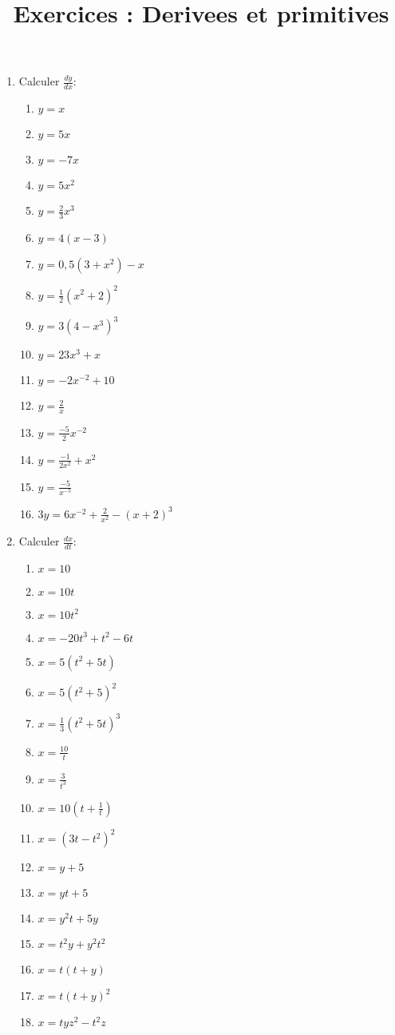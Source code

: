 \documentclass[12pt,a4paper,fleqn]{article}
\begin{document}
\title{Exercices : Derivees et primitives}
\date{}
\maketitle

\begin{enumerate}
\item Calculer $\frac{dy}{dx}$:
\begin{multicols}{3}
    \begin{enumerate}[i]
        \item $y=x$
        \item $y=5x$
        \item $y=-7x$
        \item $y=5x^2$
        \item $y=\frac{2}{3}x^3$
        \item $y=4(x-3)$
        \item $y=0,5(3 + x^2) - x$
        \item $y= \frac{1}{2}(x^2 + 2)^2 $
        \item $y= 3(4 - x^3)^3 $
        \item $y=23x^3+x$
        \item $y=-2x^{-2}+10$
        \item $y=\frac{2}{x}$
        \item $y=\frac{-5}{2}x^{-2}$
        \item $y=\frac{-1}{2x^2} + x^2$
        \item $y=\frac{-5}{x^{-5}}$
        \item $3y = 6x^{-2} + \frac{2}{x^2} - (x+2)^3 $
    \end{enumerate}
\end{multicols}    
\item Calculer $\frac{dx}{dt}$:
\begin{multicols}{3}
    \begin{enumerate}[i]
        \item $x=10$
        \item $x=10t$
        \item $x=10t^2$
        \item $x=-20t^3 + t^2 - 6t$
        \item $x = 5(t^2 + 5t)$
        \item $x = 5(t^2 + 5)^2$
        \item $x = \frac{1}{3}(t^2 + 5t)^3$
        \item $x = \frac{10}{t}$
        \item $x = \frac{3}{t^3}$
        \item $x = 10(t + \frac{1}{t}) $
        \item $x = (3t - t^2)^2$
        \item $x = y + 5$
        \item $x = yt + 5$
        \item $x = y^2t + 5y$
        \item $x = t^2y + y^2t^2$
        \item $x = t(t + y)$
        \item $x = t(t + y)^2$
        \item $x = tyz^2 - t^2z$
        

\end{enumerate}
\end{multicols}
\end{enumerate}
\end{document}
